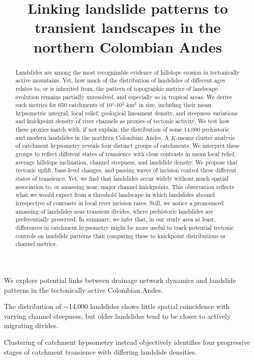 \documentclass[draft]{agujournal2019}
\begin{document}
\title{Linking landslide patterns to transient landscapes in the northern Colombian Andes}




\begin{keypoints}
\item We explore potential links between drainage network dynamics and landslide patterns in the tectonically active Colombian Andes.
\item The distribution of $\sim$14,000 landslides shows little spatial coincidence with varying channel steepness, but older landslides tend to be closer to actively migrating divides.
\item Clustering of catchment hypsometry instead objectively identifies four progressive stages of catchment transience with differing landslide densities.
\end{keypoints}

\begin{abstract}
Landslides are among the most recognizable evidence of hillslope erosion in tectonically active mountains. Yet, how much of the distribution of landslides of different ages relates to, or is inherited from, the pattern of topographic metrics of landscape evolution remains partially unresolved, and especially so in tropical areas. We derive such metrics for 650 catchments of 10$^1$-10$^2$ km$^2$ in size, including their mean hypsometric integral, local relief, geological lineament density, and steepness variations and knickpoint density of river channels as proxies of tectonic activity. We test how these proxies match with, if not explain, the distribution of some 14,000 prehistoric and modern landslides in the northern Colombian Andes. A $K$-means cluster analysis of catchment hypsometry reveals four distinct groups of catchments. We interpret these groups to reflect different states of transience with clear contrasts in mean local relief, average hillslope inclination, channel steepness, and landslide density. We propose that tectonic uplift, base-level changes, and passing waves of incision control these different states of transience. Yet, we find that landslides occur widely without much spatial association to, or amassing near, major channel knickpoints. This observation reflects what we would expect from a threshold landscape in which landslides abound irrespective of contrasts in local river incision rates. Still, we notice a pronounced amassing of landslides near transient divides, where prehistoric landslides are preferentially preserved. In summary, we infer that, in our study area at least, differences in catchment hypsometry might be more useful to track potential tectonic controls on landslide patterns than comparing these to knickpoint distributions or channel metrics.
\end{abstract}
\end{document}
